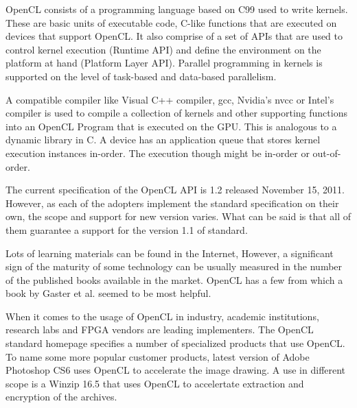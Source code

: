 OpenCL consists of a programming language based on C99 used to write kernels. These are basic units of executable code, C-like functions that are executed on devices that support OpenCL. It also comprise of a set of APIs that are used to control kernel execution (Runtime API) and define the environment on the platform at hand (Platform Layer API). Parallel programming in kernels is supported on the level of task-based and data-based parallelism.

A compatible compiler like Visual C++ compiler, gcc, Nvidia's nvcc or Intel's compiler is used to compile a collection of kernels and other supporting functions into an OpenCL Program that is executed on the GPU. This is analogous to a dynamic library in C. A device has an application queue that stores kernel execution instances in-order. The execution though might be in-order or out-of-order.

The current specification of the OpenCL API is 1.2 released November 15, 2011. However, as each of the adopters implement the standard specification on their own, the scope and support for new version varies. What can be said is that all of them guarantee a support for the version 1.1 of standard.

Lots of learning materials can be found in the Internet, However, a significant sign of the maturity of some technology can be usually measured in the number of the published books available in the market. OpenCL has a few from which a book by Gaster et al. \cite{gaster2011heterogeneous} seemed to be most helpful.

When it comes to the usage of OpenCL in industry, academic institutions, research labs and FPGA vendors are leading implementers. The OpenCL standard homepage\cite{khronos_opencl} specifies a number of specialized products that use OpenCL. To name some more popular customer products, latest version of Adobe Photoshop CS6 uses OpenCL to accelerate the image drawing. A use in different scope is a Winzip 16.5 that uses OpenCL to accelertate extraction and encryption of the archives.





